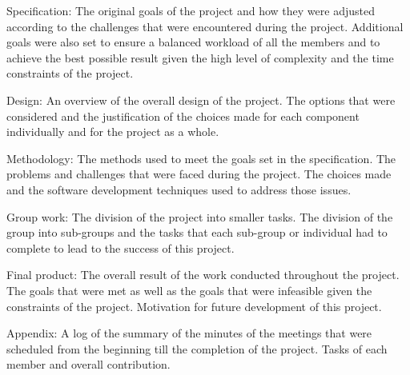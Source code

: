 \documentclass[a4paper,11pt]{article}
\begin{document}
Specification: The original goals of the project and how they were adjusted according to the challenges that were encountered during the project. Additional goals were also set to ensure a balanced workload of all the members and to achieve the best possible result given the high level of complexity and the time constraints of the project.

Design: An overview of the overall design of the project. The options that were considered and the justification of the choices made for each component individually and for the project as a whole.

Methodology: The methods used to meet the goals set in the specification. The problems and challenges that were faced during the project. The choices made and the software development techniques used to address those issues.

Group work: The division of the project into smaller tasks. The division of the group into sub-groups and the tasks that each sub-group or individual had to complete to lead to the success of this project.

Final product: The overall result of the work conducted throughout the project. The goals that were met as well as the goals that were infeasible given the constraints of the project. Motivation for future development of this project.

Appendix: A log of the summary of the minutes of the meetings that were scheduled from the beginning till the completion of the project. Tasks of each member and overall contribution.



{}

\end{document}
